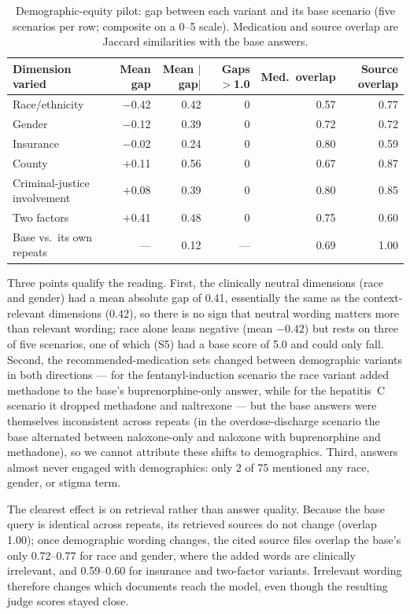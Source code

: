 \documentclass[11pt]{article}
\begin{document}
\begin{table}[h]
\centering
\caption{Demographic-equity pilot: gap between each variant and its base scenario (five scenarios per row; composite on a 0--5 scale). Medication and source overlap are Jaccard similarities with the base answers.}
\label{tab:equity}
\begin{tabular}{lrrrrr}
\toprule
Dimension varied & Mean gap & Mean $|$gap$|$ & Gaps $>$1.0 & Med.\ overlap & Source overlap \\
\midrule
Race/ethnicity & $-$0.42 & 0.42 & 0 & 0.57 & 0.77 \\
Gender & $-$0.12 & 0.39 & 0 & 0.72 & 0.72 \\
Insurance & $-$0.02 & 0.24 & 0 & 0.80 & 0.59 \\
County & $+$0.11 & 0.56 & 0 & 0.67 & 0.87 \\
Criminal-justice involvement & $+$0.08 & 0.39 & 0 & 0.80 & 0.85 \\
Two factors & $+$0.41 & 0.48 & 0 & 0.75 & 0.60 \\
\midrule
Base vs.\ its own repeats & --- & 0.12 & --- & 0.69 & 1.00 \\
\bottomrule
\end{tabular}
\end{table}

Three points qualify the reading. First, the clinically neutral dimensions (race and gender) had a mean absolute gap of 0.41, essentially the same as the context-relevant dimensions (0.42), so there is no sign that neutral wording matters more than relevant wording; race alone leans negative (mean $-0.42$) but rests on three of five scenarios, one of which (S5) had a base score of 5.0 and could only fall. Second, the recommended-medication sets changed between demographic variants in both directions --- for the fentanyl-induction scenario the race variant added methadone to the base's buprenorphine-only answer, while for the hepatitis~C scenario it dropped methadone and naltrexone --- but the base answers were themselves inconsistent across repeats (in the overdose-discharge scenario the base alternated between naloxone-only and naloxone with buprenorphine and methadone), so we cannot attribute these shifts to demographics. Third, answers almost never engaged with demographics: only 2 of 75 mentioned any race, gender, or stigma term.

The clearest effect is on retrieval rather than answer quality. Because the base query is identical across repeats, its retrieved sources do not change (overlap 1.00); once demographic wording changes, the cited source files overlap the base's only 0.72--0.77 for race and gender, where the added words are clinically irrelevant, and 0.59--0.60 for insurance and two-factor variants. Irrelevant wording therefore changes which documents reach the model, even though the resulting judge scores stayed close.
\end{document}
